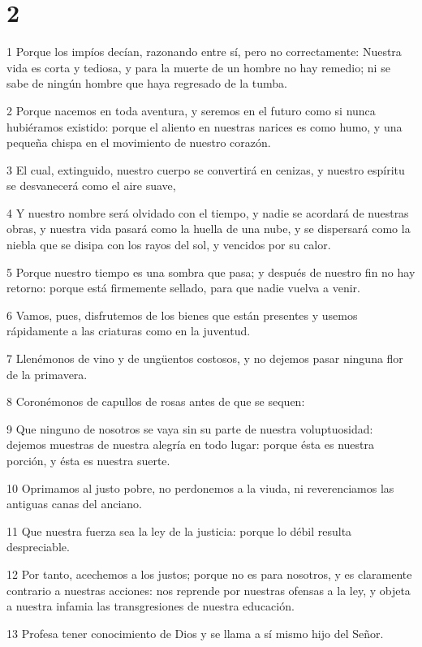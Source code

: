 \chapter{2}

\par 1 Porque los impíos decían, razonando entre sí, pero no correctamente: Nuestra vida es corta y tediosa, y para la muerte de un hombre no hay remedio; ni se sabe de ningún hombre que haya regresado de la tumba.
\par 2 Porque nacemos en toda aventura, y seremos en el futuro como si nunca hubiéramos existido: porque el aliento en nuestras narices es como humo, y una pequeña chispa en el movimiento de nuestro corazón.
\par 3 El cual, extinguido, nuestro cuerpo se convertirá en cenizas, y nuestro espíritu se desvanecerá como el aire suave,
\par 4 Y nuestro nombre será olvidado con el tiempo, y nadie se acordará de nuestras obras, y nuestra vida pasará como la huella de una nube, y se dispersará como la niebla que se disipa con los rayos del sol, y vencidos por su calor.
\par 5 Porque nuestro tiempo es una sombra que pasa; y después de nuestro fin no hay retorno: porque está firmemente sellado, para que nadie vuelva a venir.
\par 6 Vamos, pues, disfrutemos de los bienes que están presentes y usemos rápidamente a las criaturas como en la juventud.
\par 7 Llenémonos de vino y de ungüentos costosos, y no dejemos pasar ninguna flor de la primavera.
\par 8 Coronémonos de capullos de rosas antes de que se sequen:
\par 9 Que ninguno de nosotros se vaya sin su parte de nuestra voluptuosidad: dejemos muestras de nuestra alegría en todo lugar: porque ésta es nuestra porción, y ésta es nuestra suerte.
\par 10 Oprimamos al justo pobre, no perdonemos a la viuda, ni reverenciamos las antiguas canas del anciano.
\par 11 Que nuestra fuerza sea la ley de la justicia: porque lo débil resulta despreciable.
\par 12 Por tanto, acechemos a los justos; porque no es para nosotros, y es claramente contrario a nuestras acciones: nos reprende por nuestras ofensas a la ley, y objeta a nuestra infamia las transgresiones de nuestra educación.
\par 13 Profesa tener conocimiento de Dios y se llama a sí mismo hijo del Señor.
